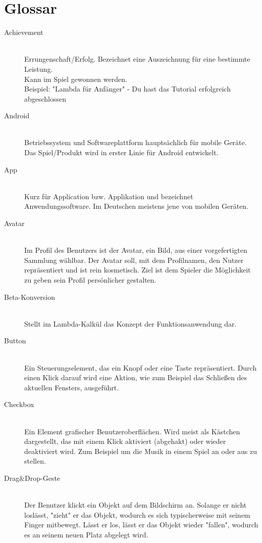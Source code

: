 \section{Glossar}

\begin{description}
	\item[Achievement] \hfill \\
	Errungenschaft/Erfolg. Bezeichnet eine Auszeichnung für eine bestimmte Leistung.\\
	Kann im Spiel gewonnen werden.\\
	Beispiel: "Lambda für Anfänger" - Du hast das Tutorial erfolgreich abgeschlossen
	
	\item[Android] \hfill \\
	Betriebssystem und Softwareplattform hauptsächlich für mobile Geräte. Das Spiel/Produkt wird in erster Linie 
	für Android entwickelt.
	
	\item[App] \hfill \\
	Kurz für Application bzw. Applikation und bezeichnet Anwendungssoftware. Im Deutschen meistens jene von mobilen Geräten.
	
	\item[Avatar] \hfill \\
	Im Profil des Benutzers ist der Avatar, ein Bild, aus einer vorgefertigten Sammlung wählbar.
	Der Avatar soll, mit dem Profilnamen, den Nutzer repräsentiert und ist rein kosmetisch.
	Ziel ist dem Spieler die Möglichkeit zu geben sein Profil persönlicher gestalten.
	
	\item[Beta-Konversion] \hfill \\
	Stellt im Lambda-Kalkül das Konzept der Funktionsanwendung dar.
	
	\item[Button] \hfill \\
	Ein Steuerungselement, das ein Knopf oder eine Taste repräsentiert. Durch einen Klick darauf wird eine Aktion, wie zum Beispiel
	das Schließen des aktuellen Fensters, ausgeführt.
	
	\item[Checkbox] \hfill \\
	Ein Element grafischer Benutzeroberflächen. Wird meist als Kästchen dargestellt, das mit einem Klick aktiviert (abgehakt) oder
	wieder deaktiviert wird. Zum Beispiel um die Musik in einem Spiel an oder aus zu stellen.
	
	\item[Drag\&Drop-Geste] \hfill \\
	Der Benutzer klickt ein Objekt auf dem Bildschirm an. Solange er nicht loslässt, "zieht" er das Objekt, wodurch
	es sich typischerweise mit seinem Finger mitbewegt. Lässt er los, lässt er das Objekt wieder "fallen", wodurch
	es an seinem neuen Platz abgelegt wird.
	

\end{description}
